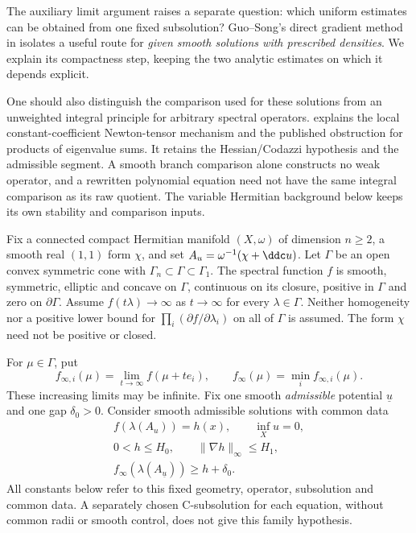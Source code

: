 The auxiliary limit argument raises a separate question: which
uniform estimates can be obtained from one fixed subsolution?
Guo--Song's direct gradient method in
\cite{GuoSong26DirectGradientV1} isolates a useful route for
\emph{given smooth solutions with prescribed densities}.
We explain its compactness step, keeping the two analytic
estimates on which it depends explicit.

One should also distinguish the comparison used for these solutions
from an unweighted integral principle for arbitrary spectral operators.
 explains the local
constant-coefficient Newton-tensor mechanism and the published
obstruction for products of eigenvalue sums. It retains the
Hessian/Codazzi hypothesis and the admissible segment. A smooth
branch comparison alone constructs no weak operator, and a rewritten
polynomial equation need not have the same integral comparison as
its raw quotient. The variable Hermitian background below keeps
its own stability and comparison inputs.

Fix a connected compact Hermitian manifold $(X,\omega)$ of
dimension $n\geq2$, a smooth real $(1,1)$ form $\chi$, and set
$A_u=\omega^{-1}(\chi+\ddc u)$.
Let $\Gamma$ be an open convex symmetric cone with
$\Gamma_n\subset\Gamma\subset\Gamma_1$.
The spectral function $f$ is smooth, symmetric, elliptic and
concave on $\Gamma$, continuous on its closure, positive in
$\Gamma$ and zero on $\partial\Gamma$.
Assume $f(t\lambda)\to\infty$ as $t\to\infty$ for every
$\lambda\in\Gamma$. Neither homogeneity nor a positive
lower bound for $\prod_i(\partial f/\partial\lambda_i)$
on all of $\Gamma$ is assumed.
The form $\chi$ need not be positive or closed.

For $\mu\in\Gamma$, put
\[
 f_{\infty,i}(\mu)=\lim_{t\to\infty}f(\mu+te_i),
 \qquad f_\infty(\mu)=\min_i f_{\infty,i}(\mu).
\]
These increasing limits may be infinite.
Fix one smooth \emph{admissible} potential $\underline u$ and
one gap $\delta_0>0$. Consider smooth admissible solutions
with common data
\[
\tag{68.23df}\label{eq:ytd-direct-gradient-common-data}
 \begin{gathered}
 f(\lambda(A_u))=h(x),\qquad \inf_Xu=0,\\
 0<h\leq H_0,\qquad \|\nabla h\|_\infty\leq H_1,\\
 f_\infty(\lambda(A_{\underline u}))\geq h+\delta_0.
 \end{gathered}
\]
All constants below refer to this fixed geometry, operator,
subsolution and common data. A separately chosen C-subsolution
for each equation, without common radii or smooth control,
does not give this family hypothesis.

